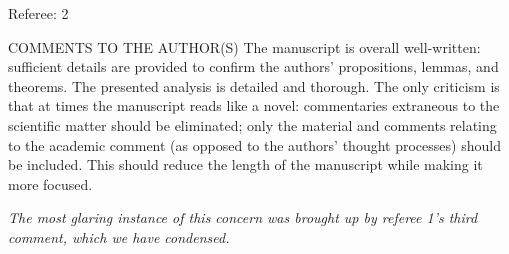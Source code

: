\documentclass[12pt]{article}
\begin{document}
Referee: 2

COMMENTS TO THE AUTHOR(S) The manuscript is overall well-written: sufficient details are provided to confirm the authors' propositions, lemmas, and theorems. The presented analysis is detailed and thorough. The only criticism is that at times the manuscript reads like a novel: commentaries extraneous to the scientific matter should be eliminated; only the material and comments relating to the academic comment (as opposed to the authors' thought processes) should be included. This should reduce the length of the manuscript while making it more focused.

\emph{The most glaring instance of this concern was brought up by referee 1's third comment, which we have condensed.}
\end{document}
